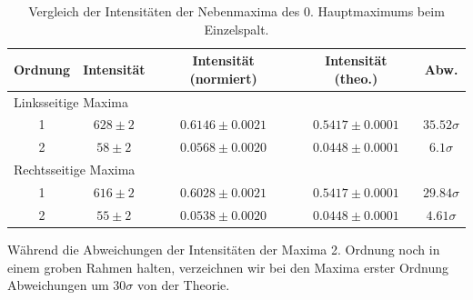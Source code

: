 \begin{table}[H]
  \centering
  \caption{Vergleich der Intensitäten der Nebenmaxima des 0. Hauptmaximums beim Einzelspalt.}
  \vspace*{0.5em}
  \begin{tabular}{|c|c|c|c|c|}\hline
    Ordnung & Intensität & Intensität (normiert) & Intensität (theo.) & Abw.\\\hline
    \multicolumn{5}{|l|}{Linksseitige Maxima}\\\hline
    1 & $628 \pm 2$   & $0.6146 \pm 0.0021$    &  $0.5417 \pm 0.0001$     &   $35.52\sigma$\\
    2 & $58 \pm 2$    & $0.0568 \pm 0.0020$    &  $0.0448 \pm 0.0001$     &   $6.1\sigma$\\\hline
    \multicolumn{5}{|l|}{Rechtsseitige Maxima}\\\hline
    1 & $616 \pm 2$  &  $0.6028 \pm 0.0021$    &  $0.5417 \pm 0.0001$   &     $29.84\sigma$\\
    2 & $55 \pm 2$   &  $0.0538 \pm 0.0020$    &  $0.0448 \pm 0.0001$   &     $4.61\sigma$\\\hline
  \end{tabular}
  \label{tab:es_vergleich_intensitaet_zsmf}
\end{table}

Während die Abweichungen der Intensitäten der Maxima 2. Ordnung noch in einem groben Rahmen halten, verzeichnen wir bei den Maxima erster Ordnung Abweichungen um $30\sigma$ von der Theorie.